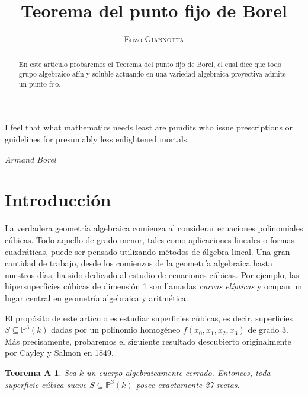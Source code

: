 \documentclass[spanish,10pt]{amsart}
\newtheorem*{theorema}{Teorema A}
\theoremstyle{definition}
\theoremstyle{remark}
\numberwithin{equation}{section}
\begin{document}
\title{Teorema del punto fijo de Borel}

\author{Enzo \textsc{Giannotta}}





\begin{abstract}
En este artículo probaremos el Teorema del punto fijo de Borel, el cual dice que todo grupo algebraico afín y soluble actuando en una variedad algebraica proyectiva admite un punto fijo.
\end{abstract}

\maketitle

\tableofcontents

\epigraph{I feel that what mathematics needs least are pundits who issue prescriptions or guidelines for presumably less enlightened mortals.}{\textit{Armand Borel}}

\section{Introducción}


La verdadera geometría algebraica comienza al considerar ecuaciones polinomiales cúbicas. Todo aquello de grado menor, tales como aplicaciones lineales o formas cuadráticas, puede ser pensado utilizando métodos de álgebra lineal. Una gran cantidad de trabajo, desde los comienzos de la geometría algebraica hasta nuestros días, ha sido dedicado al estudio de ecuaciones cúbicas. Por ejemplo, las hipersuperficies cúbicas de dimensión 1 son llamadas \emph{curvas elípticas} y ocupan un lugar central en geometría algebraica y aritmética.

\vspace{2mm}

El propósito de este artículo es estudiar superficies cúbicas, es decir, superficies $S\subseteq \mathbb{P}^3(k)$ dadas por un polinomio homogéneo $f(x_0,x_1,x_2,x_3)$ de grado 3. Más precisamente, probaremos el siguiente resultado descubierto originalmente por Cayley y Salmon en 1849.

\begin{theorema}\label{teo:Teorema A}
Sea $k$ un cuerpo algebraicamente cerrado. Entonces, toda superficie cúbica suave $S\subseteq \mathbb{P}^3(k)$ posee exactamente 27 rectas.
\end{theorema}
\end{document}
